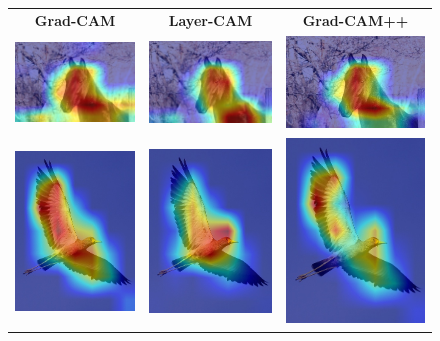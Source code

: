 \begin{figure}[!t]
  \centering
  \setlength{\tabcolsep}{0.5pt} %
  \renewcommand{\arraystretch}{0.4}

  \begin{tabular}{c c c}
    \textbf{Grad-CAM} & \textbf{Layer-CAM} & \textbf{Grad-CAM++} \\
    [2pt]
    \includegraphics[width=0.18\linewidth, height=0.18\linewidth]{figures/cams/gradcam/2007_009807_12} &
    \includegraphics[width=0.18\linewidth, height=0.18\linewidth]{figures/cams/layercam/2007_009807_12} &
    \includegraphics[width=0.18\linewidth, height=0.18\linewidth]{figures/cams/gradcampp/2007_009807_12} \\

    \includegraphics[width=0.18\linewidth, height=0.18\linewidth]{figures/cams/gradcam/2011_001967_2} &
    \includegraphics[width=0.18\linewidth, height=0.18\linewidth]{figures/cams/layercam/2011_001967_2} &
    \includegraphics[width=0.18\linewidth, height=0.18\linewidth]{figures/cams/gradcampp/2011_001967_2} \\


\end{tabular}
\end{figure}
